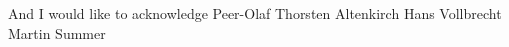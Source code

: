 
\begin{acknowledgements}      


And I would like to acknowledge 
Peer-Olaf
Thorsten Altenkirch
Hans Vollbrecht
Martin Summer

\end{acknowledgements}
